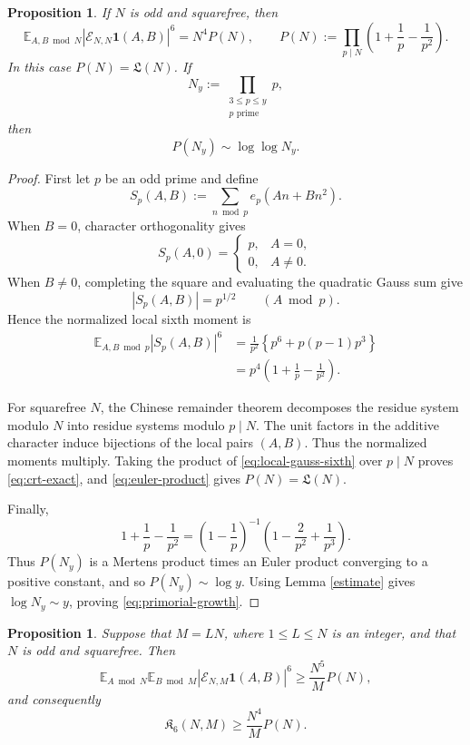 \documentclass[11pt, twoside]{article}
\numberwithin{equation}{section}
\newtheorem{proposition}[theorem]{Proposition}
\theoremstyle{definition}
\newcommand{\E}{\mathbb E}
\newcommand{\cE}{\mathcal E}
\newcommand{\ind}{\mathbf 1}
\newcommand{\Lcal}{\mathfrak L}
\newcommand{\Ksix}{\mathfrak K_6}
\begin{document}
\begin{proposition}
\label{prop:crt}
If $N$ is odd and squarefree, then
\begin{equation}\label{eq:crt-exact}
\E_{A,B\bmod N}|\cE_{N,N}\ind(A,B)|^6
=N^4P(N),
\qquad
P(N):=\prod_{p\mid N}\left(1+\frac1p-\frac1{p^2}\right).
\end{equation}
In this case $P(N)=\Lcal(N)$.  If
$$
N_y:=\prod_{\substack{3\leq p\leq y \\ \text{$p$ prime}}}p,
$$
then
\begin{equation}\label{eq:primorial-growth}
P(N_y)\sim\log\log N_y.
\end{equation}
\end{proposition}

\begin{proof}
First let $p$ be an odd prime and define
$$
S_p(A,B):=\sum_{n\bmod p}e_p(An+Bn^2).
$$
When $B=0$, character orthogonality gives
$$
S_p(A,0)=
\begin{cases}
p,&A=0,\\
0,&A\neq0.
\end{cases}
$$
When $B\neq0$, completing the square and evaluating the quadratic Gauss sum
give
$$
|S_p(A,B)|=p^{1/2}
\qquad(A\bmod p).
$$
Hence the normalized local sixth moment is
\begin{equation}\label{eq:local-gauss-sixth}
\begin{aligned}
\E_{A,B\bmod p}|S_p(A,B)|^6
&=\frac1{p^2}\left\{p^6+p(p-1)p^3\right\}\\
&=p^4\left(1+\frac1p-\frac1{p^2}\right).
\end{aligned}
\end{equation}

For squarefree $N$, the Chinese remainder theorem decomposes the residue
system modulo $N$ into residue systems modulo $p\mid N$.  The unit factors
in the additive character induce bijections of the local pairs $(A,B)$.
Thus the normalized moments multiply.  Taking the product of
\eqref{eq:local-gauss-sixth} over $p\mid N$ proves \eqref{eq:crt-exact}, and
\eqref{eq:euler-product} gives $P(N)=\Lcal(N)$.

Finally,
$$
1+\frac1p-\frac1{p^2}
=\left(1-\frac1p\right)^{-1}
\left(1-\frac{2}{p^2}+\frac1{p^3}\right).
$$
Thus $P(N_y)$ is a Mertens product times an Euler product converging to a
positive constant, and so $P(N_y)\sim\log y$. Using Lemma \ref{estimate} gives $\log N_y\sim y$, proving
\eqref{eq:primorial-growth}.
\end{proof}

\begin{proposition}\label{prop:subgrid-lower}
Suppose that $M=LN$, where $1\leq L\leq N$ is an integer, and that $N$ is
odd and squarefree.  Then
$$
\E_{A\bmod N}\E_{B\bmod M}|\cE_{N,M}\ind(A,B)|^6
\geq\frac{N^5}{M}P(N),
$$
and consequently
\begin{equation}\label{eq:subgrid-K}
\Ksix(N,M)\geq\frac{N^4}{M}P(N).
\end{equation}
\end{proposition}
\end{document}
